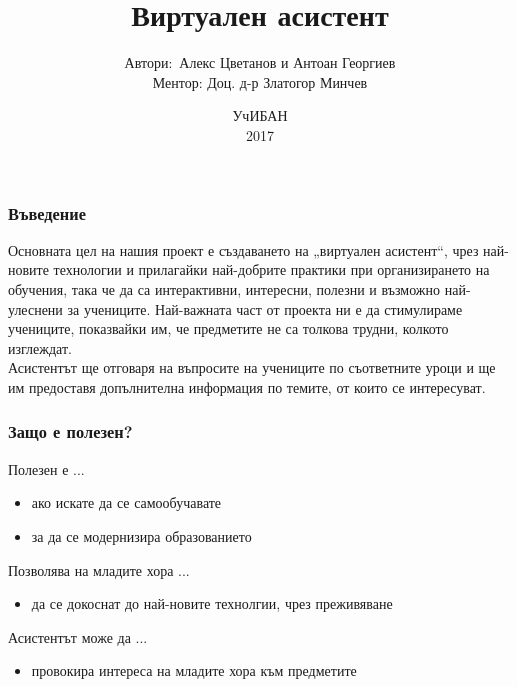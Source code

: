\documentclass[12pt]{beamer}
\begin{document}
	
	\date[УчИБАН'17]{УчИБАН \\ 2017}
	\author[Алекс, Антоан]{
		\begin{table}[]
			\begin{tabular}{rl}
				\normalsize{Автори:\      } & \normalsize{Алекс Цветанов и Антоан Георгиев} \\
				\scriptsize{Ментор:     } & \scriptsize{Доц. д-р Златогор Минчев}
			\end{tabular}
		\end{table}
	}
	\title[Виртуален асистент]{Виртуален асистент}
	\begin{frame}
		\titlepage
 	\end{frame}
	\begin{frame}
		\frametitle{Въведение}
		\begin{block}{}
			Основната цел на нашия проект е създаването на „виртуален асистент“, чрез най-новите технологии и прилагайки най-добрите практики при организирането на обучения, така че да са интерактивни, интересни, полезни и възможно най-улеснени за учениците. Най-важната част от проекта ни е да стимулираме учениците, показвайки им, че предметите не са толкова трудни, колкото изглеждат. \\
			\vspace{2ex}
			Асистентът ще отговаря на въпросите на учениците по съответните уроци и ще им предоставя допълнителна информация по темите, от които се интересуват.
		\end{block}
 	\end{frame}
	\begin{frame}
		\frametitle{Защо е полезен?}
		\begin{block}{Полезен е ...}
			\begin{itemize}
				\item ако искате да се самообучавате
				\item за да се модернизира образованието
			\end{itemize}
		\end{block}
		\begin{block}{Позволява на младите хора ...}
			\begin{itemize}
				\item да се докоснат до най-новите технолгии, чрез преживяване
			\end{itemize}
		\end{block}
		\begin{block}{Асистентът може да ...}
			\begin{itemize}
				\item провокира интереса на младите хора към предметите
			\end{itemize}
		\end{block}
	\end{frame}
\end{document}
